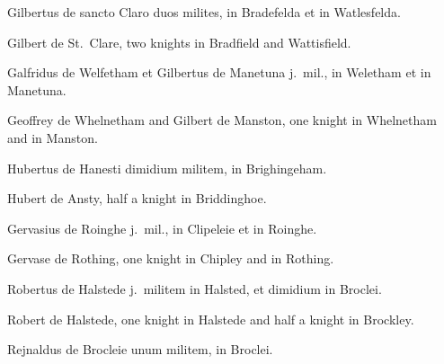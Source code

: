 \documentclass[10pt]{book}
\begin{document}
\begin{paracol}{2}
\switchcolumn*

\begin{otherlanguage}{latin}
Gilbertus de sancto Claro duos milites, in Bradefelda et in Watlesfelda.
\end{otherlanguage}

\switchcolumn

Gilbert de St.\ Clare, two knights in Bradfield and Wattisfield.

\switchcolumn*

\begin{otherlanguage}{latin}
Galfridus de Welfetham et Gilbertus de Manetuna j.\ mil., in Weletham et in Manetuna.
\end{otherlanguage}

\switchcolumn

Geoffrey de Whelnetham and Gilbert de Manston, one knight in Whelnetham and in Manston.

\switchcolumn*

\begin{otherlanguage}{latin}
Hubertus de Hanesti dimidium militem, in Brighingeham.
\end{otherlanguage}

\switchcolumn

Hubert de Ansty, half a knight in Briddinghoe.

\switchcolumn*

\begin{otherlanguage}{latin}
Gervasius de Roinghe j.\ mil., in Clipeleie et in Roinghe.
\end{otherlanguage}

\switchcolumn

Gervase de Rothing, one knight in Chipley and in Rothing.

\switchcolumn*

\begin{otherlanguage}{latin}
Robertus de Halstede j.\ militem in Halsted, et dimidium in Broclei.
\end{otherlanguage}

\switchcolumn

Robert de Halstede, one knight in Halstede and half a knight in Brockley.

\switchcolumn*

\begin{otherlanguage}{latin}
Rejnaldus de Brocleie unum militem, in Broclei.
\end{otherlanguage}

\switchcolumn


\end{paracol}
\end{document}
